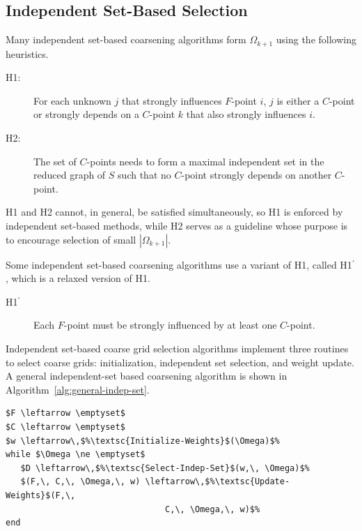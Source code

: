 \documentclass{elsart}
\newcommand{\hp}{H1$^\prime$}
\begin{document}
\subsection{Independent Set-Based Selection}
\label{sec:indep-set-based}
Many independent set-based coarsening algorithms form $\Omega_{k+1}$
using the following heuristics.
\begin{description}
\item[H1:] For each unknown $j$ that strongly influences $F$-point
  $i$, $j$ is either a $C$-point or strongly depends on a $C$-point
  $k$ that also strongly influences $i$.
\item[H2:] The set of $C$-points needs to form a maximal independent
  set in the reduced graph of $S$ such that no $C$-point strongly
  depends on another $C$-point.
\end{description}
H1 and H2 cannot, in general, be satisfied simultaneously, so H1 is
enforced by independent set-based methods, while H2 serves as a
guideline whose purpose is to encourage selection of small
$|\Omega_{k+1}|$.

Some independent set-based coarsening algorithms use a variant of H1,
called \hp, which is a relaxed version of H1.
\begin{description}
\item[\hp] Each $F$-point must be strongly influenced by at least one
  $C$-point.
\end{description}

Independent set-based coarse grid selection algorithms implement three
routines to select coarse grids: initialization, independent set
selection, and weight update. A general independent-set based
coarsening algorithm is shown in
Algorithm~\ref{alg:general-indep-set}.
\begin{lstlisting}[caption={Independent Set-Based Coarse Grid
Selection},label=alg:general-indep-set]
%\textsc{Indep-Set-Coarse-Grid-Selection}$(\Omega)$:%
$F \leftarrow \emptyset$
$C \leftarrow \emptyset$
$w \leftarrow\,$%\textsc{Initialize-Weights}$(\Omega)$%
while $\Omega \ne \emptyset$
   $D \leftarrow\,$%\textsc{Select-Indep-Set}$(w,\, \Omega)$%
   $(F,\, C,\, \Omega,\, w) \leftarrow\,$%\textsc{Update-Weights}$(F,\,
                                C,\, \Omega,\, w)$%
end
\end{lstlisting}
\end{document}
